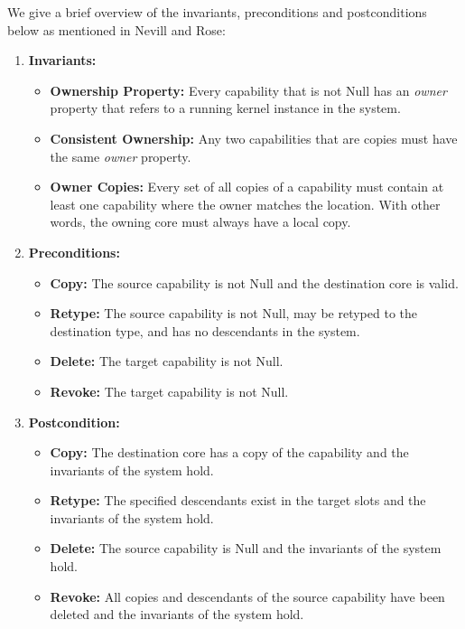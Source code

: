 We give a brief overview of the invariants, preconditions and postconditions below as mentioned in Nevill and Rose:~\cite{nevillmasters}

\begin{enumerate}
\item \textbf{Invariants:}
	\begin{itemize}
	\item \textbf{Ownership Property:} Every capability that is not Null has an \textit{owner} property that refers to a running kernel instance in the system.
	\item \textbf{Consistent Ownership:} Any two capabilities that are copies must have the same \textit{owner} property.
	\item \textbf{Owner Copies:} Every set of all copies of a capability must contain at least one capability where the owner matches the location. With other words, the owning core must always have a local copy.
	\end{itemize}
	
\item \textbf{Preconditions:}
\begin{itemize}
\item \textbf{Copy:} The source capability is not Null and the destination core is valid.
\item \textbf{Retype:} The source capability is not Null, may be retyped to the destination type, and has no descendants in the system.
\item \textbf{Delete:} The target capability is not Null.
\item \textbf{Revoke:} The target capability is not Null.
\end{itemize}

\item \textbf{Postcondition:}
\begin{itemize}
\item \textbf{Copy:} The destination core has a copy of the capability and the invariants of the system hold.
\item \textbf{Retype:} The specified descendants exist in the target slots and the invariants of the system hold.
\item \textbf{Delete:} The source capability is Null and the invariants of the system hold.
\item \textbf{Revoke:} All copies and descendants of the source capability have been deleted and the invariants of the system hold.
\end{itemize}
\end{enumerate}

